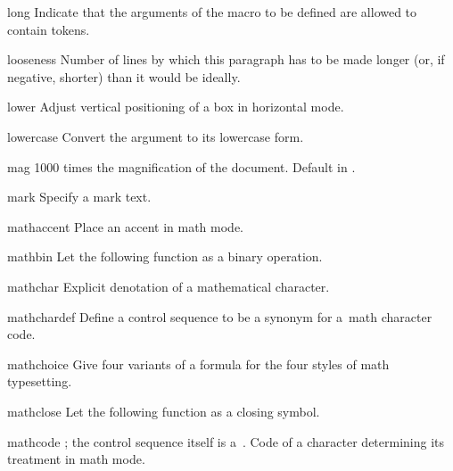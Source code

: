 \item long
      Indicate that the arguments of the macro to be defined  
      are allowed to contain  tokens.

\item looseness 
      Number of lines by which this paragraph has to be made longer 
      (or, if negative, shorter) than it would be ideally.

\item lower
      Adjust vertical positioning of a box in horizontal mode. 

\item lowercase
      Convert the argument to its lowercase form.

\item mag
      1000 times the magnification of the document.
      Default  in \IniTeX.

\item mark
      Specify a mark text.

\item mathaccent
      Place an accent in math mode.

\item mathbin
      Let the following  function 
      as a binary operation.

\item mathchar
      Explicit denotation of a mathematical character.

\item mathchardef
      Define a control sequence to be a synonym for
      a~math character code.

\item mathchoice\lb{}\rb
      Give four variants of a formula for the four styles
      of math typesetting.
      
\item mathclose
      Let the following  function
      as a closing symbol.

\item mathcode
      ; the control sequence itself
      is a~.
      Code of a character determining its treatment in math mode.

